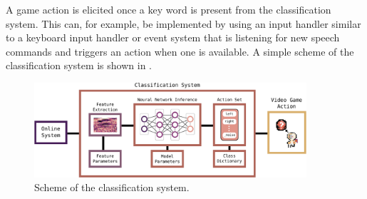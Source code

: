 A game action is elicited once a key word is present from the classification system.
This can, for example, be implemented by using an input handler similar to a keyboard input handler or event system that is listening for new speech commands and triggers an action when one is available.
A simple scheme of the classification system is shown in .
\begin{figure}[!ht]
  \centering
  \includegraphics[width=0.9\textwidth]{./6_game/figs/game_system_classification.pdf}
  \caption{Scheme of the classification system.}
  \label{fig:game_system_classification}
\end{figure}
\FloatBarrier
\noindent

